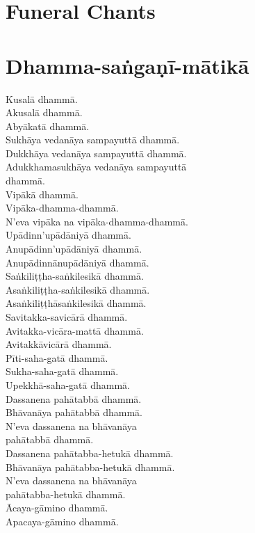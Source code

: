\chapter{Funeral Chants}

\chapter{Dhamma-saṅgaṇī-mātikā}

Kusalā dhammā.\\
Akusalā dhammā.\\
Abyākatā dhammā.\\
Sukhāya vedanāya sampayuttā dhammā.\\
Dukkhāya vedanāya sampayuttā dhammā.\\
Adukkhamasukhāya vedanāya sampayuttā\\
dhammā.\\
Vipākā dhammā.\\
Vipāka-dhamma-dhammā.\\
N’eva vipāka na vipāka-dhamma-dhammā.\\
Upādinn’upādāniyā dhammā.\\
Anupādinn’upādāniyā dhammā.\\
Anupādinnānupādāniyā dhammā.\\
Saṅkiliṭṭha-saṅkilesikā dhammā.\\
Asaṅkiliṭṭha-saṅkilesikā dhammā.\\
Asaṅkiliṭṭhāsaṅkilesikā dhammā.\\
Savitakka-savicārā dhammā.\\
Avitakka-vicāra-mattā dhammā.\\
Avitakkāvicārā dhammā.\\
Pīti-saha-gatā dhammā.\\
Sukha-saha-gatā dhammā.\\
Upekkhā-saha-gatā dhammā.\\
Dassanena pahātabbā dhammā.\\
Bhāvanāya pahātabbā dhammā.\\
N’eva dassanena na bhāvanāya\\
pahātabbā dhammā.\\
Dassanena pahātabba-hetukā dhammā.\\
Bhāvanāya pahātabba-hetukā dhammā.\\
N’eva dassanena na bhāvanāya\\
pahātabba-hetukā dhammā.\\
Ācaya-gāmino dhammā.\\
Apacaya-gāmino dhammā.\\
